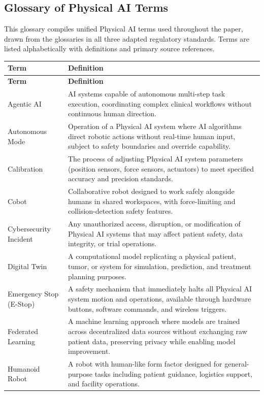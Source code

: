 \newpage

\subsection{Glossary of Physical AI Terms}
\label{app:glossary}

This glossary compiles unified Physical AI terms used throughout the paper,
drawn from the glossaries in all three adapted regulatory standards. Terms are
listed alphabetically with definitions and primary source references.

\begin{longtable}{p{4.5cm} p{11cm}}
\toprule
\textbf{Term} & \textbf{Definition} \\
\midrule
\endfirsthead
\toprule
\textbf{Term} & \textbf{Definition} \\
\midrule
\endhead
\bottomrule
\endfoot
Agentic AI & AI systems capable of autonomous multi-step task execution, coordinating complex clinical workflows without continuous human direction. \\
Autonomous Mode & Operation of a Physical AI system where AI algorithms direct robotic actions without real-time human input, subject to safety boundaries and override capability. \\
Calibration & The process of adjusting Physical AI system parameters (position sensors, force sensors, actuators) to meet specified accuracy and precision standards. \\
Cobot & Collaborative robot designed to work safely alongside humans in shared workspaces, with force-limiting and collision-detection safety features. \\
Cybersecurity Incident & Any unauthorized access, disruption, or modification of Physical AI systems that may affect patient safety, data integrity, or trial operations. \\
Digital Twin & A computational model replicating a physical patient, tumor, or system for simulation, prediction, and treatment planning purposes. \\
Emergency Stop (E-Stop) & A safety mechanism that immediately halts all Physical AI system motion and operations, available through hardware buttons, software commands, and wireless triggers. \\
Federated Learning & A machine learning approach where models are trained across decentralized data sources without exchanging raw patient data, preserving privacy while enabling model improvement. \\
Humanoid Robot & A robot with human-like form factor designed for general-purpose tasks including patient guidance, logistics support, and facility operations. \\

\end{longtable}
